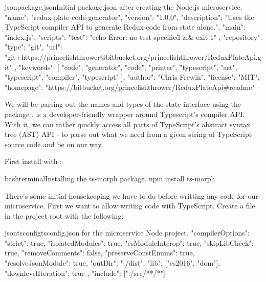 \documentclass[paper=6in:9in,pagesize=pdftex,headinclude=on,footinclude=on,12pt,twoside]{scrbook}
\begin{document}
\begin{codeInput}{json}{package.json}{Initial package.json after creating the Node.js microservice.}
{
  "name": "redux-plate-code-generator",
  "version": "1.0.0",
  "description": "Uses the TypeScript compiler API to generate Redux code from state alone.",
  "main": "index.js",
  "scripts": {
    "test": "echo \"Error: no test specified\" && exit 1"
  },
  "repository": {
    "type": "git",
    "url": "git+https://princefishthrower@bitbucket.org/princefishthrower/ReduxPlateApi.git"
  },
  "keywords": [
    "code",
    "generator",
    "code",
    "printer",
    "typescript",
    "ast",
    "typescript",
    "compiler",
    "typescript"
  ],
  "author": "Chris Frewin",
  "license": "MIT",
  "homepage": "https://bitbucket.org/princefishthrower/ReduxPlateApi#readme"
}
\end{codeInput}


We will be parsing out the names and types of the state interface using the package .  is a developer-friendly wrapper around Typescript's compiler API. With it, we can rather quickly access all parts of TypeScript's abstract syntax tree (AST) API - to parse out what we need from a given string of TypeScript source code and be on our way.

First install  with :

\begin{codeInput}{bash}{terminal}{Installing the ts-morph package.}
npm install ts-morph
\end{codeInput}


There's some initial housekeeping we have to do before writting any code for our microservice. First we want to allow writing code with TypeScript. Create a  file in the project root with the following:

\begin{codeInput}{json}{tsconfig}{tsconfig.json for the microservice Node project.}
{
  "compilerOptions": {
    "strict": true,
    "isolatedModules": true,
    "esModuleInterop": true,
    "skipLibCheck": true,
    "removeComments": false,
    "preserveConstEnums": true,
    "resolveJsonModule": true,
    "outDir": "./dist",
    "lib": ["es2016", "dom"],
    "downlevelIteration": true
  },
  "include": ["./src/**/*"]
}
\end{codeInput}
\end{document}
